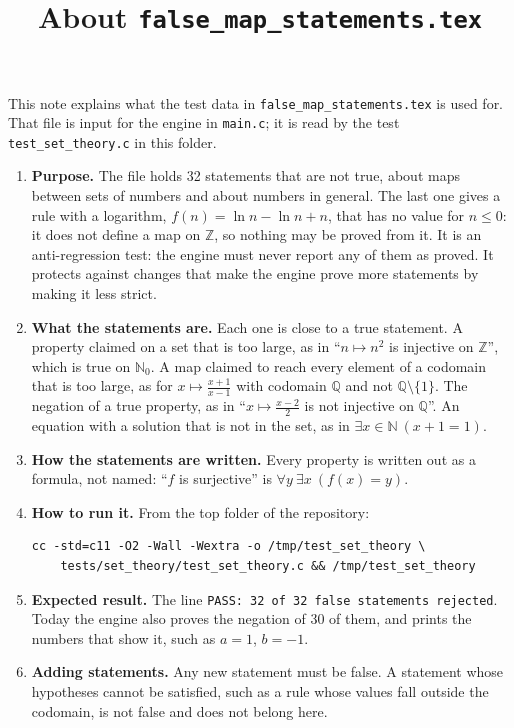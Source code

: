\documentclass[11pt,a4paper]{article}
\title{About \texttt{false\_map\_statements.tex}}
\author{}
\date{}
\begin{document}
\maketitle
This note explains what the test data in \texttt{false\_map\_statements.tex} is used for. That file is input for the engine in \texttt{main.c}; it is read by the test \texttt{test\_set\_theory.c} in this folder.

\begin{enumerate}
\item \textbf{Purpose.} The file holds 32 statements that are not true, about maps between sets of numbers and about numbers in general. The last one gives a rule with a logarithm, $f(n) = \ln n - \ln n + n$, that has no value for $n \le 0$: it does not define a map on $\mathbb{Z}$, so nothing may be proved from it. It is an anti-regression test: the engine must never report any of them as proved. It protects against changes that make the engine prove more statements by making it less strict.

\item \textbf{What the statements are.} Each one is close to a true statement. A property claimed on a set that is too large, as in ``$n \mapsto n^{2}$ is injective on $\mathbb{Z}$'', which is true on $\mathbb{N}_{0}$. A map claimed to reach every element of a codomain that is too large, as for $x \mapsto \frac{x + 1}{x - 1}$ with codomain $\mathbb{Q}$ and not $\mathbb{Q} \setminus \{1\}$. The negation of a true property, as in ``$x \mapsto \frac{x - 2}{2}$ is not injective on $\mathbb{Q}$''. An equation with a solution that is not in the set, as in $\exists x \in \mathbb{N}\ (x + 1 = 1)$.

\item \textbf{How the statements are written.} Every property is written out as a formula, not named: ``$f$ is surjective'' is $\forall y\ \exists x\ (f(x) = y)$.

\item \textbf{How to run it.} From the top folder of the repository:
\begin{verbatim}
cc -std=c11 -O2 -Wall -Wextra -o /tmp/test_set_theory \
    tests/set_theory/test_set_theory.c && /tmp/test_set_theory
\end{verbatim}

\item \textbf{Expected result.} The line \texttt{PASS: 32 of 32 false statements rejected}. Today the engine also proves the negation of 30 of them, and prints the numbers that show it, such as $a = 1$, $b = -1$.

\item \textbf{Adding statements.} Any new statement must be false. A statement whose hypotheses cannot be satisfied, such as a rule whose values fall outside the codomain, is not false and does not belong here.
\end{enumerate}
\end{document}
